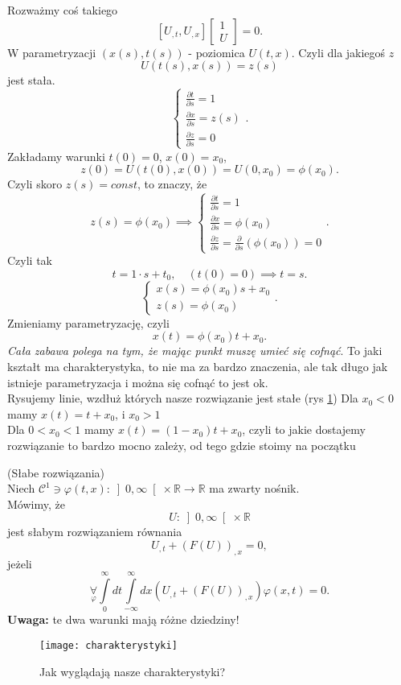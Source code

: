 \documentclass[../main.tex]{subfiles}
\begin{document}
Rozważmy coś takiego
\[
    \left[ U_{,t}, U_{,x} \right] \begin{bmatrix} 1\\U \end{bmatrix} = 0
.\]
W parametryzacji $(x(s), t(s))$ - poziomica $U(t,x)$.
Czyli dla jakiegoś $z$
 \[
     U(t(s),x(s)) = z(s)
\]
jest stała.
\[
    \begin{cases}
        \frac{\partial t}{\partial s} = 1\\
        \frac{\partial x}{\partial s} = z(s)\\
        \frac{\partial z}{\partial s} = 0
    \end{cases}
.\]
Zakładamy warunki $t(0) = 0$, $x(0) = x_0$,
\[
    z(0) = U(t(0), x(0)) = U(0,x_0) = \phi(x_0)
.\]
Czyli skoro $z(s) = const$, to znaczy, że
 \[
     z(s) = \phi(x_0) \implies \begin{cases}
         \frac{\partial t}{\partial s} = 1\\
         \frac{\partial x}{\partial s} = \phi(x_0)\\
         \frac{\partial z}{\partial s} = \frac{\partial }{\partial s} \left( \phi(x_0) \right) = 0
     \end{cases}
.\]
Czyli tak
\[
    t = 1 \cdot s + t_0,\quad (t(0) = 0) \implies t = s
.\]
\[
    \begin{cases}
        x(s) = \phi(x_0) s + x_0\\
        z(s) = \phi(x_0)
    \end{cases}
.\]
Zmieniamy parametryzację, czyli
\[
    x(t) = \phi(x_0)t + x_0
.\]
\textit{Cała zabawa polega na tym, że mając punkt muszę umieć się cofnąć}. To jaki kształt ma charakterystyka, to nie ma za bardzo znaczenia, ale tak długo jak istnieje parametryzacja i można się cofnąć to jest ok.\\
Rysujemy linie, wzdłuż których nasze rozwiązanie jest stałe (rys \ref{fig:charakterystyki})
Dla $x_0 < 0$ mamy $x(t) = t + x_0$, i $x_0 > 1$ \\
Dla $0 < x_0 < 1$ mamy $x(t) = (1-x_0)t + x_0$, czyli to jakie dostajemy rozwiązanie to bardzo mocno zależy, od tego gdzie stoimy na początku

\begin{definicja}
    (Słabe rozwiązania)\\
    Niech $\mathcal{C}^1 \ni \varphi(t,x): \left]0, \infty\right[ \times \mathbb{R}\to \mathbb{R}$ ma zwarty nośnik.\\
    Mówimy, że
    \[
        U: \left]0,\infty\right[\times\mathbb{R}
    \]
    jest słabym rozwiązaniem równania
    \[
        U_{,t} + \left( F(U) \right)_{,x} = 0
    ,\]
jeżeli
\[
    \underset{\varphi}{\forall} \int\limits_{0}^{\infty} dt \int\limits_{-\infty}^{\infty} dx \left( U_{,t} + \left( F(U) \right)_{,x} \right) \varphi(x,t) = 0
.\]
\textbf{Uwaga: } te dwa warunki mają różne dziedziny!
\end{definicja}
\begin{figure}[h]
    \centering
    \texttt{[image: charakterystyki]}
    \caption{Jak wyglądają nasze charakterystyki?}
    \label{fig:charakterystyki}
\end{figure}
\end{document}
